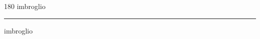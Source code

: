 
\begin{frame}
\begin{center}
\begin{turn}{180}
{\fontsize{2.5cm}{1em}\selectfont imbroglio}
\end{turn}
\vspace{1em}\par  
\hrule
\vspace{1em}\par  
{\fontsize{2.5cm}{1em}\selectfont imbroglio}
\end{center}
\end{frame}
